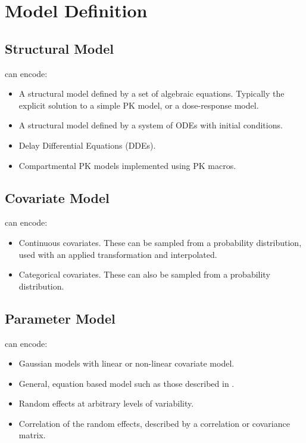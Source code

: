 \section{Model Definition}
\subsection{Structural Model}

\pharmml can encode:
\begin{itemize}
\item{A structural model defined by a set of algebraic equations.} Typically the explicit solution to a simple PK model, or a dose-response model.
\item{A structural model defined by a system of ODEs with initial conditions.} 
\item{Delay Differential Equations (DDEs).}
\item{Compartmental PK models implemented using PK macros.}
\end{itemize}

\subsection{Covariate Model}

\pharmml can encode:
\begin{itemize}
\item{Continuous covariates.} These can be sampled from a probability distribution, 
used with an applied transformation and interpolated.
\item{Categorical covariates.} These can also be sampled from a probability distribution.
\end{itemize}

\subsection{Parameter Model}

\pharmml can encode:
\begin{itemize}
\item{Gaussian models with linear or non-linear covariate model.}
\item{General, equation based model such as those described in \cite{Keizer:2011aa}.}
\item{Random effects at arbitrary levels of variability.}
\item{Correlation of the random effects, described by a correlation or covariance matrix.}
\end{itemize}

